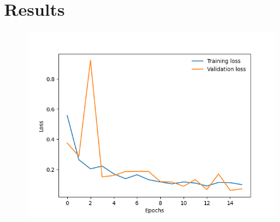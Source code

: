 \section{Results}

\begin{figure}[htb]
    \centering
    \includegraphics[scale=0.50]
    {./figures/mobile_model_apple_trees_16its_2022-11-15_training_curve}
    \caption{
    }
    \label{fig:apple-tree-mode-training-curve}
\end{figure}
